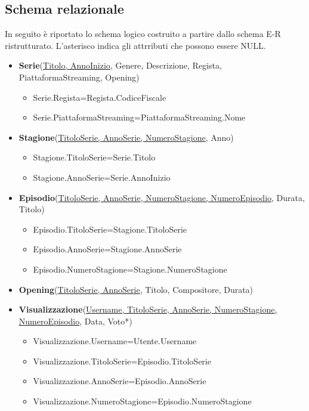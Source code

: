 \documentclass[10pt,a4paper]{article}
\begin{document}
\subsection{Schema relazionale}
In seguito è riportato lo schema logico costruito a partire dallo schema E-R ristrutturato.
L'asterisco indica gli attrributi che possono essere NULL.
\begin{itemize}
    \item \textbf{Serie}(\underline{Titolo, AnnoInizio}, Genere, Descrizione, Regista, PiattaformaStreaming, Opening)
    \begin{itemize}
        \item Serie.Regista=Regista.CodiceFiscale
        \item Serie.PiattaformaStreaming=PiattaformaStreaming.Nome
    \end{itemize}
    \item \textbf{Stagione}(\underline{TitoloSerie, AnnoSerie, NumeroStagione}, Anno)
    \begin{itemize}
        \item Stagione.TitoloSerie=Serie.Titolo
        \item Stagione.AnnoSerie=Serie.AnnoInizio
    \end{itemize}
    \item \textbf{Episodio}(\underline{TitoloSerie, AnnoSerie, NumeroStagione, NumeroEpisodio}, Durata, Titolo)
    \begin{itemize}
        \item Episodio.TitoloSerie=Stagione.TitoloSerie
        \item Episodio.AnnoSerie=Stagione.AnnoSerie
        \item Episodio.NumeroStagione=Stagione.NumeroStagione
    \end{itemize}
    \item \textbf{Opening}(\underline{TitoloSerie, AnnoSerie}, Titolo, Compositore, Durata)
    \item \textbf{Visualizzazione}(\underline{Username, TitoloSerie, AnnoSerie, NumeroStagione, NumeroEpisodio}, Data, Voto*) 
    \begin{itemize}
        \item Visualizzazione.Username=Utente.Username
        \item Visualizzazione.TitoloSerie=Episodio.TitoloSerie
        \item Visualizzazione.AnnoSerie=Episodio.AnnoSerie
        \item Visualizzazione.NumeroStagione=Episodio.NumeroStagione

\end{itemize}
\end{itemize}
\end{document}
